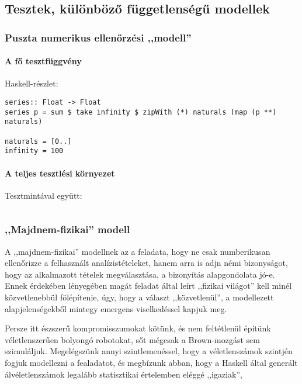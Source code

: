 \documentclass{article}
\begin{document}
	\subsection{Tesztek, különböző függetlenségű modellek}

	\subsubsection{Puszta numerikus ellenőrzési ,,modell''}

	\paragraph{A fő tesztfüggvény} Haskell-részlet:

	\begin{verbatim}
series:: Float -> Float
series p = sum $ take infinity $ zipWith (*) naturals (map (p **) naturals)

naturals = [0..]
infinity = 100
	\end{verbatim}

	\paragraph{A teljes tesztlési környezet} Tesztmintával együtt:

	\inputminted{haskell}{Series.hs}

	\subsubsection{,,Majdnem-fizikai'' modell}

	A ,,majdnem-fizikai'' modellnek az a feladata, hogy ne csak numberikusan ellenőrizze a felhasznált analízistételeket,
	hanem arra is adjn némi bizonyságot, hogy az alkalmazott tételek megválasztása, a bizonyítás alapgondolata jó-e.
	Ennek érdekében lényegében magát  feladat által leírt ,,fizikai világot'' kell minél közvetlenebbül fölépítenie,
	úgy, hogy a választ ,,közvetlenül'', a modellezett alapjelenségekből mintegy emergens viselkedéssel kapjuk  meg.

	Persze itt észszerű kompromisszumokat kötünk, és nem feltétlenül építünk véletlenszerűen bolyongó robotokat, sőt mégcsak a Brown-mozgást sem szimuláljuk.
	Megelégszünk annyi szintlemenéssel, hogy a véletlenszámok szintjén fogjuk modellezni a fealadatot, és megbízunk abban, hogy a Haskell által generált álvéletlenszámok legalább statisztikai értelemben eléggé ,,igaziak'',
\end{document}
